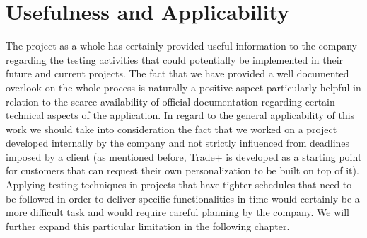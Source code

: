 \section{Usefulness and Applicability} 

The project as a whole has certainly provided useful information to the company regarding the testing activities that could potentially be implemented in their future and current projects. The fact that we have provided a well documented overlook on the whole process is naturally a positive aspect particularly helpful in relation to the scarce availability of official documentation regarding certain technical aspects of the application. 
In regard to the general applicability of this work we should take into consideration the fact that we worked on a project developed internally by the company and not strictly influenced from deadlines imposed by a client (as mentioned before, Trade+ is developed as a starting point for customers that can request their own personalization to be built on top of it). Applying testing techniques in projects that have tighter schedules that need to be followed in order to deliver specific functionalities in time would certainly be a more difficult task and would require careful planning by the company. We will further expand this particular limitation in the following chapter.